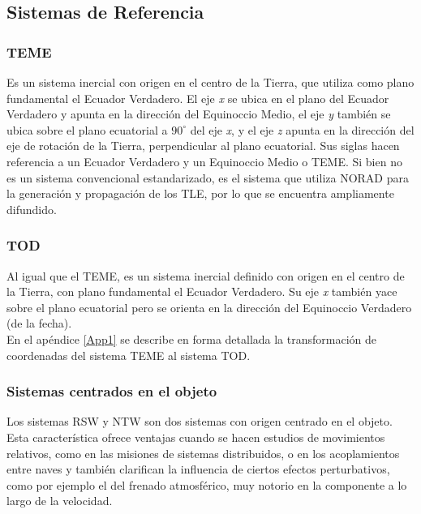 {\subsection{Sistemas de Referencia}\label{subsec:sistRef}

\subsubsection*{TEME}
 Es un sistema inercial con origen en el centro de la Tierra, que utiliza como plano fundamental el Ecuador Verdadero. El eje {\it{x}} se ubica en el plano del Ecuador Verdadero y apunta en la direcci\'on del Equinoccio Medio, el eje {\it{y}} tambi\'en se ubica sobre el plano ecuatorial a $90^{\circ}$ del eje {\it{x}}, y el eje {\it{z}} apunta en la direcci\'on del eje de rotaci\'on de la Tierra, perpendicular al plano ecuatorial. Sus siglas hacen referencia a un Ecuador Verdadero y un Equinoccio Medio o \ac{TEME}. Si bien no es un sistema convencional estandarizado, es el sistema que utiliza NORAD para la generaci\'on y propagaci\'on de los TLE, por lo que se encuentra ampliamente difundido.
 
\subsubsection*{\ac{TOD}}
 Al igual que el TEME, es un sistema inercial definido con origen en el centro de la Tierra, con plano fundamental el Ecuador Verdadero. Su eje {\it{x}} tambi\'en yace sobre el plano ecuatorial pero se orienta en la direcci\'on del Equinoccio Verdadero (de la fecha).\\
 En el ap\'endice \ref{App1} se describe en forma detallada la transformaci\'on de coordenadas del sistema TEME al sistema TOD.
 
\subsubsection*{Sistemas centrados en el objeto}
Los sistemas RSW y NTW son dos sistemas con origen centrado en el objeto. Esta caracter\'istica ofrece ventajas cuando se hacen estudios de movimientos relativos, como en las misiones de sistemas distribuidos, o en los acoplamientos entre naves y tambi\'en clarifican la influencia de ciertos efectos perturbativos, como por ejemplo el del frenado atmosf\'erico, muy notorio en la componente a lo largo de la velocidad.\\

}

